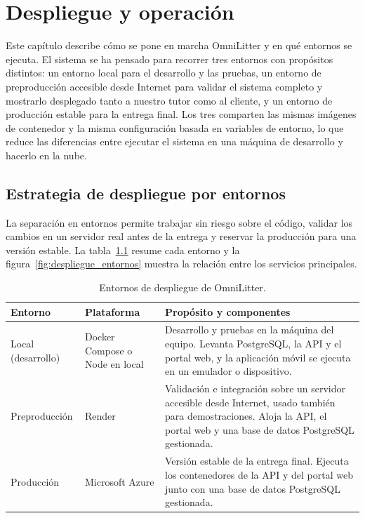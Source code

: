 \chapter{Despliegue y operación}

Este capítulo describe cómo se pone en marcha OmniLitter y en qué entornos se ejecuta.
El sistema se ha pensado para recorrer tres entornos con propósitos distintos: un
entorno local para el desarrollo y las pruebas, un entorno de preproducción accesible
desde Internet para validar el sistema completo y mostrarlo desplegado tanto a nuestro tutor como al cliente, y un entorno de producción
estable para la entrega final. Los tres comparten las mismas imágenes de contenedor y
la misma configuración basada en variables de entorno, lo que reduce las diferencias
entre ejecutar el sistema en una máquina de desarrollo y hacerlo en la nube.

\section{Estrategia de despliegue por entornos}

La separación en entornos permite trabajar sin riesgo sobre el código, validar los
cambios en un servidor real antes de la entrega y reservar la producción para una
versión estable. La tabla~\ref{tab:entornos_despliegue} resume cada entorno y la
figura~\ref{fig:despliegue_entornos} muestra la relación entre los servicios
principales.

\begin{table}[H]
\centering
\caption{Entornos de despliegue de OmniLitter.}
\label{tab:entornos_despliegue}
\small
\begin{tabularx}{\textwidth}{p{2.6cm} p{3.4cm} X}
\toprule
\textbf{Entorno} & \textbf{Plataforma} & \textbf{Propósito y componentes} \\
\midrule
Local (desarrollo) & Docker Compose o Node en local &
Desarrollo y pruebas en la máquina del equipo. Levanta PostgreSQL, la API y el portal
web, y la aplicación móvil se ejecuta en un emulador o dispositivo. \\
Preproducción & Render &
Validación e integración sobre un servidor accesible desde Internet, usado también para
demostraciones. Aloja la API, el portal web y una base de datos PostgreSQL gestionada. \\
Producción & Microsoft Azure &
Versión estable de la entrega final. Ejecuta los contenedores de la API y del portal
web junto con una base de datos PostgreSQL gestionada. \\
\bottomrule
\end{tabularx}
\end{table}

